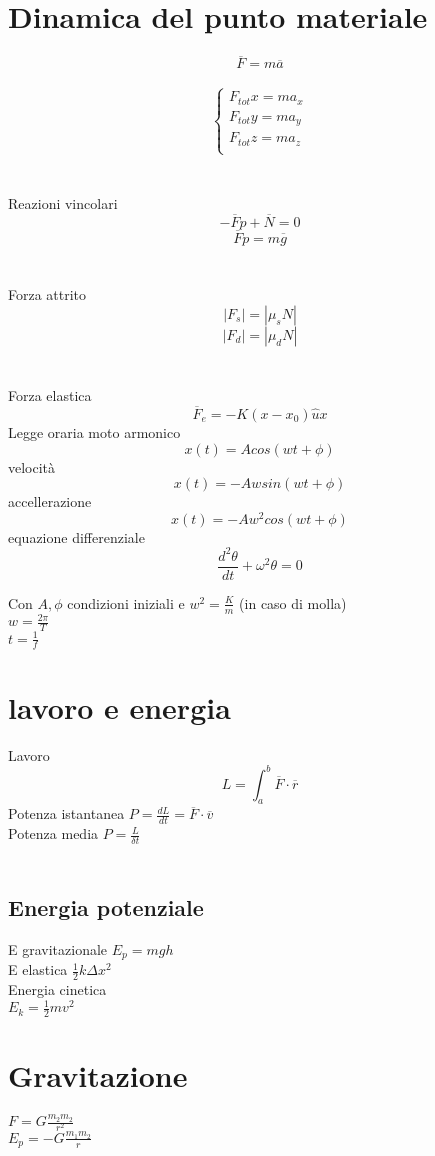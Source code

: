 \documentclass{article}
\begin{document}
\section{Dinamica del punto materiale}
\[\overline{F} = m\overline{a}\]\\
\[
\begin{cases}
	F_{tot} x = ma_x \\
	F_{tot} y = ma_y   \\
	F_{tot} z = ma_z   \\
\end{cases}
\]\\\\
\large{Reazioni vincolari}
\[-\overline{F}p + \overline{N} = 0\]
\[\overline{F}p = m\overline{g}\]
\\\\
\large{Forza attrito}
\[|F_s| = |\mu_sN|\]
\[|F_d| = |\mu_dN|\]
\\\\
\large{Forza elastica}
\[\overline{F}_e = -K(x-x_0)\hat{u}x\]
\large{Legge oraria moto armonico}
\[x(t) = A cos(wt + \phi)\]
velocità
\[x(t) = -Aw sin(wt + \phi)\]
accellerazione
\[x(t) = -Aw^2 cos(wt + \phi)\]
equazione differenziale
\[\frac{d^2\theta}{dt}+\omega^2\theta=0\]

Con \(A, \phi\) condizioni iniziali e \(w^2 = \frac{K}{m}\) (in caso di molla)\\
\(w=\frac{2\pi}{T}\)\\
\(t=\frac{1}{f}\)\\
\section{lavoro e energia}
Lavoro
\[L=\int_{a}^{b}\overline{F}\cdot\overline{r}\]
Potenza istantanea \(P=\frac{dL}{dt}=\overline{F}\cdot\overline{v}\)\\
Potenza media \(P=\frac{L}{\delta t}\)\\\\
\subsection{Energia potenziale}
E gravitazionale \(E_p = mgh\)\\
E elastica \(\frac{1}{2}k\Delta x^2\)\\
\Large{Energia cinetica}\\
\(E_k= \frac{1}{2}mv^2\)
\section{Gravitazione}
\(F=G\frac{m_{2} m_{2}}{r^2}\)\\
\(E_p=-G\frac{m_{1}m_{2}}{r}\)
\end{document}
